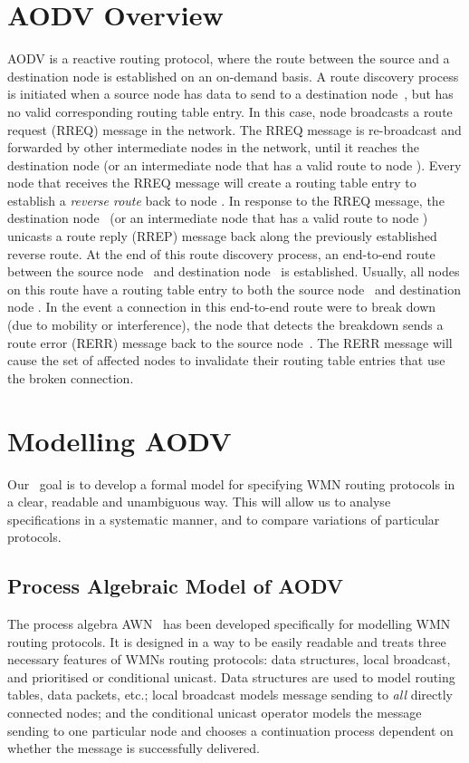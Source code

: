 \documentclass[conference,twoside]{IEEEtran}
\newcommand{\awn}{AWN\xspace}
\begin{document}
\section{AODV Overview}
\label{sec:AodvOverview}
AODV is a reactive routing protocol, where the route between the source  and a destination node is established on an on-demand basis. A route discovery process is initiated when a source node  has data to send to a destination node~, but has no valid corresponding routing table entry. In this case, node  broadcasts a route request (RREQ) message in the network. The RREQ message is re-broadcast and forwarded by other intermediate nodes in the network, until it reaches the destination node  (or an intermediate node that has a valid route to node ). Every node that receives the RREQ message will create a routing table entry to establish a \emph{reverse route} back to node . In response to the RREQ message, the destination node~ (or an intermediate node that has a valid route to node ) unicasts a route reply (RREP) message back along the previously established reverse route. At the end of this route discovery process, an end-to-end route between the source node~ and destination node~ is established. Usually, all nodes on this route have a routing table entry to both the source node~ and destination node . In the event a connection in this end-to-end route were to break down (due to mobility or interference), the node that detects the breakdown sends a route error (RERR) message back to the source node~. The RERR message will cause the set of affected nodes to invalidate their routing table entries that use the broken connection.

\section{Modelling AODV}
Our \ goal is to develop a formal model for
specifying WMN routing protocols in a clear, readable and
unambiguous way. This will allow us to
analyse specifications in a systematic manner, and to compare
variations of particular protocols.

\subsection{Process Algebraic Model of AODV}\label{ssec:processalgebra}
The process algebra \awn~\cite{TR11}
has been developed specifically for modelling WMN routing protocols.\pagebreak{} It is designed in a way to be easily readable and
treats three necessary features of WMNs routing protocols:
 data structures, local broadcast, and prioritised or conditional unicast.
Data structures are used to model routing tables, data packets, etc.;
local broadcast models message sending to {\em all} directly
connected nodes; and the
conditional unicast operator models the
message sending
to one particular node and chooses a continuation process dependent on whether the
message is successfully delivered.
\end{document}

